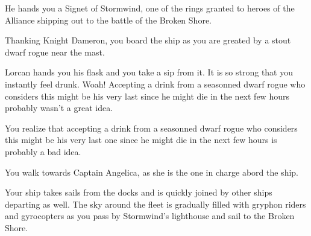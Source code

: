 He hands you a Signet of Stormwind, one of the rings granted to heroes of the Alliance shipping out to the battle of the Broken Shore.  %


Thanking Knight Dameron, you board the ship as you are greated by a stout dwarf rogue near the mast.


Lorcan hands you his flask and you take a sip from it. It is so strong that you instantly feel drunk. Woah! Accepting a drink from a seasonned dwarf rogue who considers this might be his very last since he might die in the next few hours probably wasn't a great idea. %

You realize that accepting a drink from a seasonned dwarf rogue who considers this might be his very last one since he might die in the next few hours is probably a bad idea.

You walk towards Captain Angelica, as she is the one in charge abord the ship.



Your ship takes sails from the docks and is quickly joined by other ships departing as well. The sky around the fleet is gradually filled with gryphon riders and gyrocopters as you pass by Stormwind's lighthouse and sail to the Broken Shore.


